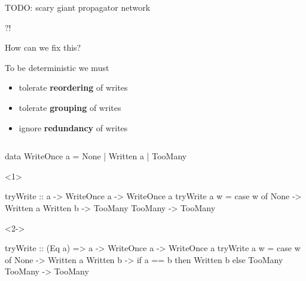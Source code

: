 \documentclass[UKenglish,usenames,dvipsnames,svgnames,table,aspectratio=169,mathserif]{beamer}
\newcommand{\nl}{\vspace{\baselineskip}}
\begin{document}
\begin{frame}

TODO: scary giant propagator network
\end{frame}


\begin{frame}
\centering
\fontsize{60}{70}\selectfont $?!$

\end{frame}


\begin{frame}
\centering \huge

How can we fix this?
\end{frame}


\begin{frame}

To be deterministic we must

\begin{itemize}
\item tolerate {\bf reordering} of writes
\item tolerate {\bf grouping} of writes
\item ignore {\bf redundancy} of writes
\end{itemize}
\end{frame}


\begin{frame}[fragile]
\begin{columns}
\begin{overlayarea}{\textwidth}{0.6\textheight}
\begin{haskellcode}
data WriteOnce a
  = None
  | Written a
  | TooMany
\end{haskellcode}

\nl

\begin{onlyenv}<1>
\begin{haskellcode}
tryWrite ::           a -> WriteOnce a -> WriteOnce a
tryWrite a w = case w of
  None      -> Written a
  Written b -> TooMany
  TooMany   -> TooMany
\end{haskellcode}
\end{onlyenv}

\begin{onlyenv}<2->
\begin{haskellcode}
tryWrite :: (Eq a) => a -> WriteOnce a -> WriteOnce a
tryWrite a w = case w of
  None      -> Written a
  Written b -> if a == b then Written b else TooMany
  TooMany   -> TooMany
\end{haskellcode}
\end{onlyenv}
\end{overlayarea}
\end{columns}
\end{frame}
\end{document}
